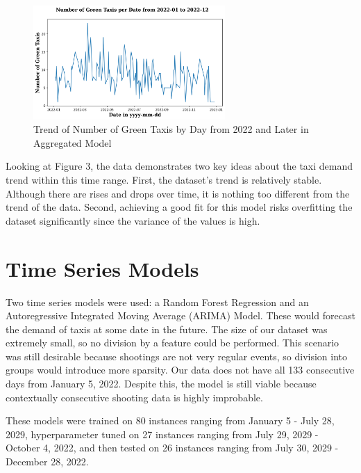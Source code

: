 \documentclass[11pt]{article}
\begin{document}
\begin{figure}[h]
    \includegraphics[width=0.65\textwidth]{plots_new/green_per_date_modelling.png}
    \centering
    \caption{Trend of Number of Green Taxis by Day from 2022 and Later in Aggregated Model} %
\end{figure}

Looking at Figure 3, the data demonstrates two key ideas about the taxi demand trend within this time range. First, the dataset's trend is relatively stable. Although there are rises and drops over time, it is nothing too different from the trend of the data. Second, achieving a good fit for this model risks overfitting the dataset significantly since the variance of the values is high. 

\section{Time Series Models}

Two time series models were used: a Random Forest Regression and an Autoregressive Integrated Moving Average (ARIMA) Model. These would forecast the demand of taxis at some date in the future. The size of our dataset was extremely small, so no division by a feature could be performed. This scenario was still desirable because shootings are not very regular events, so division into groups would introduce more sparsity. Our data does not have all 133 consecutive days from January 5, 2022. Despite this, the model is still viable because contextually consecutive shooting data is highly improbable. 

These models were trained on 80 instances ranging from January 5 - July 28, 2029, hyperparameter tuned on 27 instances ranging from July 29, 2029 - October 4, 2022, and then tested on 26 instances ranging from July 30, 2029 - December 28, 2022.
\end{document}
